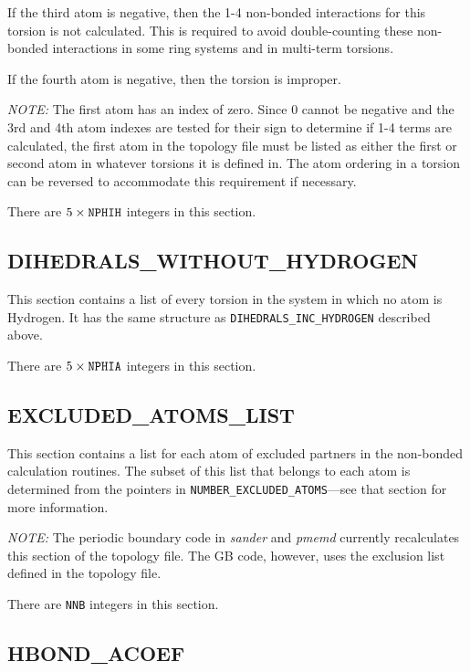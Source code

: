 If the third atom is negative, then the 1-4 non-bonded interactions for this
torsion is not calculated. This is required to avoid double-counting these
non-bonded interactions in some ring systems and in multi-term torsions.

If the fourth atom is negative, then the torsion is improper.

\emph{NOTE:} The first atom has an index of zero. Since 0 cannot be negative and
the 3rd and 4th atom indexes are tested for their sign to determine if 1-4 terms
are calculated, the first atom in the topology file must be listed as either the
first or second atom in whatever torsions it is defined in. The atom ordering in
a torsion can be reversed to accommodate this requirement if necessary.


\noindent There are $5 \times {\tt NPHIH}$ integers in this section.

\subsection*{DIHEDRALS\_WITHOUT\_HYDROGEN}

This section contains a list of every torsion in the system in which no atom is
Hydrogen. It has the same structure as {\tt DIHEDRALS\_INC\_HYDROGEN} described
above.


\noindent There are $5 \times {\tt NPHIA}$ integers in this section.

\subsection*{EXCLUDED\_ATOMS\_LIST}

This section contains a list for each atom of excluded partners in the
non-bonded calculation routines. The subset of this list that belongs to each
atom is determined from the pointers in {\tt NUMBER\_EXCLUDED\_ATOMS}---see that
section for more information.

\emph{NOTE:} The periodic boundary code in \emph{sander} and \emph{pmemd}
currently recalculates this section of the topology file. The GB code, however,
uses the exclusion list defined in the topology file.


\noindent There are {\tt NNB} integers in this section.

\subsection*{HBOND\_ACOEF}

